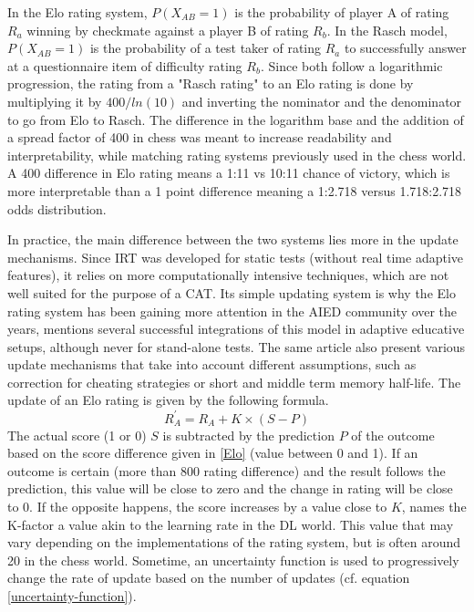 In the Elo rating system, $P(X_{AB} = 1)$ is the probability of player A of rating $R_a$ winning by checkmate against a player B of rating $R_b$. In the Rasch model, $P(X_{AB} = 1)$ is the probability of a test taker of rating $R_a$ to successfully answer at a questionnaire item of difficulty rating $R_b$. Since both follow a logarithmic progression, the rating from a "Rasch rating" to an Elo rating is done by multiplying it by $400/ln(10)$ and inverting the nominator and the denominator to go from Elo to Rasch. The difference in the logarithm base and the addition of a spread factor of 400 in chess was meant to increase readability and interpretability, while matching rating systems previously used in the chess world. A 400 difference in Elo rating means a 1:11 vs 10:11 chance of victory, which is more interpretable than a 1 point difference meaning a 1:2.718 versus 1.718:2.718 odds distribution.

In practice, the main difference between the two systems lies more in the update mechanisms. Since IRT was developed for static tests (without real time adaptive features), it relies on more computationally intensive techniques, which are not well suited for the purpose of a CAT. Its simple updating system is why the Elo rating system has been gaining more attention in the AIED community over the years, \cite{pelanek_applications_2016} mentions several successful integrations of this model in adaptive educative setups, although never for stand-alone tests. The same article also present various update mechanisms that take into account different assumptions, such as correction for cheating strategies or short and middle term memory half-life. The update of an Elo rating is given by the following formula.
\begin{equation}
    R_{A}^{\prime}= R_A+K \times{(S-P)}
    \label{Update Elo}
\end{equation}
The actual score (1 or 0) $S$ is subtracted by the prediction $P$ of the outcome based on the score difference given in \ref{Elo} (value between 0 and 1). If an outcome is certain (more than 800 rating difference) and the result follows the prediction, this value will be close to zero and the change in rating will be close to 0. If the opposite happens, the score increases by a value close to $K$, names the K-factor a value akin to the learning rate in the DL world. This value that may vary depending on the implementations of the rating system, but is often around 20 in the chess world. Sometime, an uncertainty function is used to progressively change the rate of update based on the number of updates (cf. equation \ref{uncertainty-function}).


